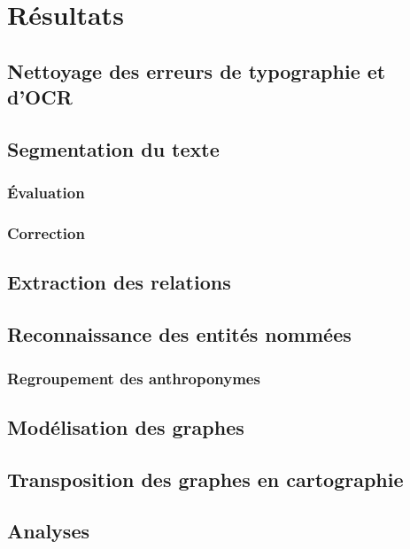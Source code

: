 \chapter{Résultats}
\section{Nettoyage des erreurs de typographie et d'OCR}
\section{Segmentation du texte}
\subsection{Évaluation}
\subsection{Correction}
\section{Extraction des relations}
\section{Reconnaissance des entités nommées}
\subsection{Regroupement des anthroponymes}
\section{Modélisation des graphes}
\section{Transposition des graphes en cartographie}
\section{Analyses}



